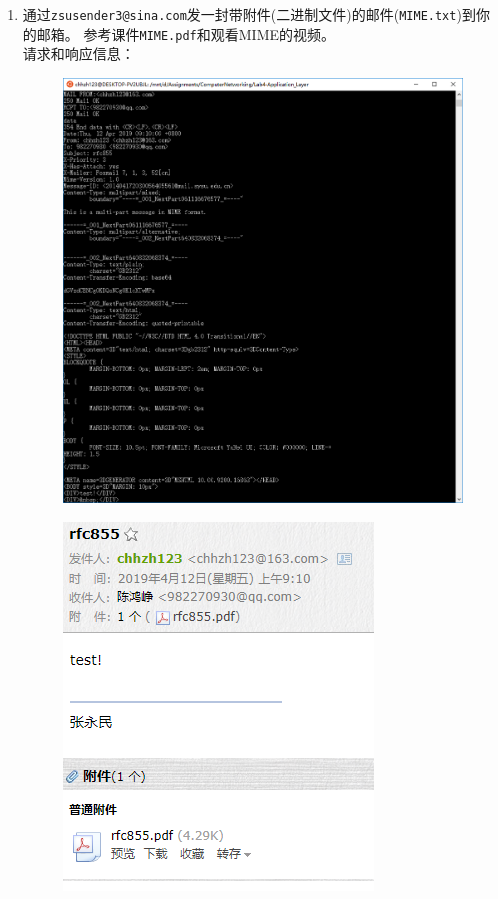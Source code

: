 \documentclass[logo,reportComp]{thesis}
\begin{document}
\begin{enumerate}
\item 通过\verb'zsusender3@sina.com'发一封带附件(二进制文件)的邮件(\verb'MIME.txt')到你的邮箱。
参考课件\verb'MIME.pdf'和观看MIME的视频。\\
请求和响应信息：
\begin{figure}[H]
\centering
\includegraphics[width=0.8\linewidth]{fig/smtp-2.PNG}
\end{figure}
\begin{figure}[H]
\centering
\includegraphics[width=0.2\linewidth]{fig/smtp-21.PNG}
\end{figure}


\end{enumerate}
\end{document}
